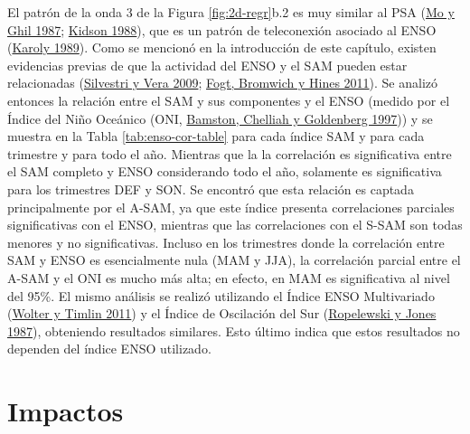 \documentclass[12pt,oneside,a4paper]{reedthesis}
\begin{document}
El patrón de la onda 3 de la Figura \ref{fig:2d-regr}b.2 es muy similar al PSA (\protect\hyperlink{ref-mo1987}{Mo y Ghil 1987}; \protect\hyperlink{ref-kidson1988}{Kidson 1988}), que es un patrón de teleconexión asociado al ENSO (\protect\hyperlink{ref-karoly1989}{Karoly 1989}).
Como se mencionó en la introducción de este capítulo, existen evidencias previas de que la actividad del ENSO y el SAM pueden estar relacionadas (\protect\hyperlink{ref-silvestri2009}{Silvestri y Vera 2009}; \protect\hyperlink{ref-fogt2011a}{Fogt, Bromwich y Hines 2011}).
Se analizó entonces la relación entre el SAM y sus componentes y el ENSO (medido por el Índice del Niño Oceánico (ONI, \protect\hyperlink{ref-bamston1997}{Bamston, Chelliah y Goldenberg 1997})) y se muestra en la Tabla \ref{tab:enso-cor-table} para cada índice SAM y para cada trimestre y para todo el año.
Mientras que la la correlación es significativa entre el SAM completo y ENSO considerando todo el año, solamente es significativa para los trimestres DEF y SON.
Se encontró que esta relación es captada principalmente por el A-SAM, ya que este índice presenta correlaciones parciales significativas con el ENSO, mientras que las correlaciones con el S-SAM son todas menores y no significativas.
Incluso en los trimestres donde la correlación entre SAM y ENSO es esencialmente nula (MAM y JJA), la correlación parcial entre el A-SAM y el ONI es mucho más alta; en efecto, en MAM es significativa al nivel del 95\%.
El mismo análisis se realizó utilizando el Índice ENSO Multivariado (\protect\hyperlink{ref-wolter2011}{Wolter y Timlin 2011}) y el Índice de Oscilación del Sur (\protect\hyperlink{ref-ropelewski1987}{Ropelewski y Jones 1987}), obteniendo resultados similares.
Esto último indica que estos resultados no dependen del índice ENSO utilizado.

\hypertarget{impacts}{%
\section{Impactos}\label{impacts}}
\end{document}
